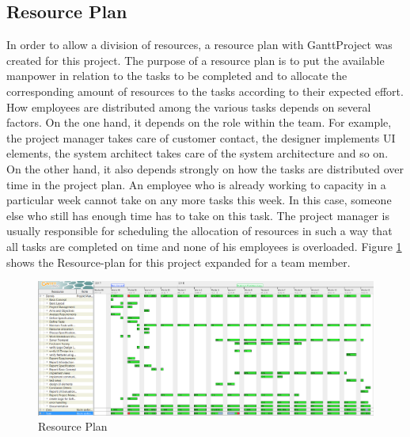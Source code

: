 \subsection{Resource Plan}
In order to allow a division of resources, a resource plan with GanttProject was created for this project. The purpose of a resource plan is to put the available manpower in relation to the tasks to be completed and to allocate the corresponding amount of resources to the tasks according to their expected effort. How employees are distributed among the various tasks depends on several factors. On the one hand, it depends on the role within the team. For example, the project manager takes care of customer contact, the designer implements UI elements, the system architect takes care of the system architecture and so on. On the other hand, it also depends strongly on how the tasks are distributed over time in the project plan. An employee who is already working to capacity in a particular week cannot take on any more tasks this week. In this case, someone else who still has enough time has to take on this task. The project manager is usually responsible for scheduling the allocation of resources in such a way that all tasks are completed on time and none of his employees is overloaded. Figure \ref{resource-plan} shows the Resource-plan for this project expanded for a team member.
\begin{landscape}
	\thispagestyle{plain}
	\begin{figure}[H]
		\centering
		\includegraphics[width =1.4\textwidth]{images/Resourcenplan.PNG}
		\caption{Resource Plan}
		\label{resource-plan}
	\end{figure}
\end{landscape}
